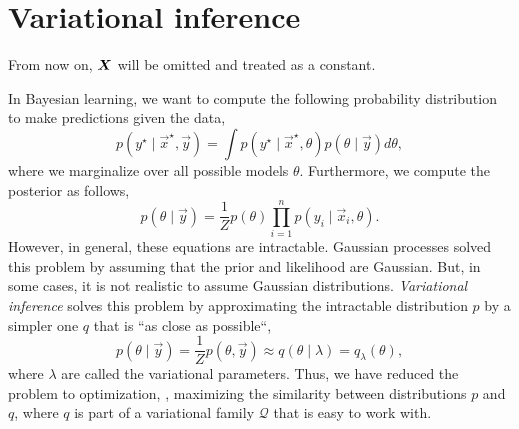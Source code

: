 \section{Variational inference} \label{sec:vi}

\begin{remark}
  From now on, $\bm{X}$ will be omitted and treated as a constant.
\end{remark}

In Bayesian learning, we want to compute the following probability
distribution to make predictions given the data, \[
  p(y^\star \mid \vec{x}^\star, \vec{y})  = \int p(y^\star\mid\vec{x}^\star,\theta)p(\theta\mid\vec{y})d\theta
,\]
where we marginalize over all possible models $\theta$. Furthermore, we
compute the posterior as follows, \[
  p(\theta\mid\vec{y}) = \frac{1}{Z}p(\theta)\prod_{i=1}^n p(y_i\mid \vec{x}_i,\theta)
.\]
However, in general, these equations are intractable. Gaussian processes solved this
problem by assuming that the prior and likelihood are
Gaussian. But, in some
cases, it is not realistic to assume Gaussian distributions.
\textit{Variational inference} solves this problem by approximating the
intractable distribution $p$ by a simpler one $q$ that is ``as close as
possible``, \[
  p(\theta\mid\vec{y}) = \frac{1}{Z} p(\theta,\vec{y}) \approx q(\theta\mid\lambda) = q_\lambda (\theta)
,\]
where $\lambda$ are called the variational parameters. Thus, we have reduced
the problem to optimization, \ie, maximizing the similarity between
distributions $p$ and $q$, where $q$ is part of a variational family
$\mathcal{Q}$ that is easy to work with.

